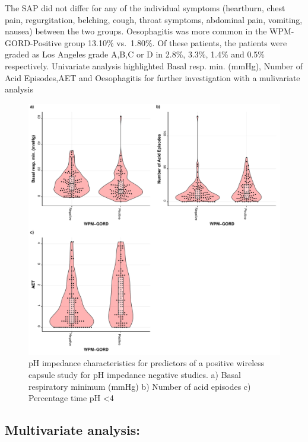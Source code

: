 \documentclass[english,man,floatsintext]{apa6}
\begin{document}
The SAP did not differ for any of the individual symptoms (heartburn, chest pain, regurgitation, belching, cough, throat symptoms, abdominal pain, vomiting, nausea) between the two groups. Oesophagitis was more common in the WPM-GORD-Positive group 13.10\% vs.~1.80\%. Of these patients, the patients were graded as Los Angeles grade A,B,C or D in 2.8\%, 3.3\%, 1.4\% and 0.5\% respectively.
Univariate analysis highlighted Basal resp. min. (mmHg), Number of Acid Episodes,AET and Oesophagitis for further investigation with a mulivariate analysis

\pagebreak

\pagebreak

\begin{figure}

\includegraphics{TemplateReport_files/figure-latex/UnivariatePredictorsGraph-1} \hfill{}

\caption{pH impedance characteristics for predictors of a positive wireless capsule study for pH impedance negative studies. a) Basal respiratory minimum (mmHg)  b) Number of acid episodes c) Percentage time pH <4}\label{fig:UnivariatePredictorsGraph}
\end{figure}

\pagebreak

\hypertarget{multivariate-analysis}{%
\subsection{Multivariate analysis:}\label{multivariate-analysis}}
\end{document}
